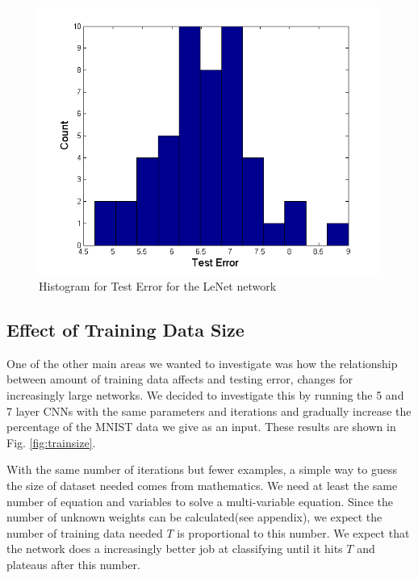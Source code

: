 \documentclass[12pt, twocolumn]{article}
\begin{document}
\begin{figure}
	\includegraphics[scale=.5]{hist2layer.png}
	\caption{Histogram for Test Error for the LeNet network}
	\label{fig:histlenet}
\end{figure}




\subsection{Effect of Training Data Size}
One of the other main areas we wanted to investigate was how the relationship between amount of training data affects and testing error, changes for increasingly large networks. We decided to investigate this by running the 5 and 7 layer CNNs with the same parameters and iterations and gradually increase the percentage of the MNIST data we give as an input. These results are shown in Fig. \ref{fig:trainsize}.  

With the same number of iterations but fewer examples, a simple way to guess the size of dataset needed comes from mathematics.  We need at least the same number of equation and variables to solve a multi-variable equation. Since the number of unknown weights can be calculated(see appendix), we expect the number of training data needed $T$ is proportional to this number. We expect that the network does a increasingly better job at classifying until it hits $T$ and plateaus after this number.
\end{document}
